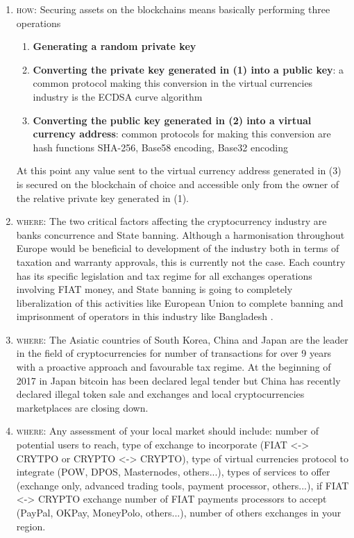 \documentclass[11pt,fleqn,oneside]{book} %
\begin{document}
\begin{enumerate}
	\item \textsc{how}: Securing assets on the blockchains means basically performing three operations
		\begin{enumerate}[label*=\arabic*.]
			\item \textbf{Generating a random private key}
			\item \textbf{Converting the private key generated in (1) into a public key}: a common protocol making this conversion
			in the virtual currencies industry is the ECDSA curve algorithm
			\item \textbf{Converting the public key generated in (2) into a virtual currency address}: common protocols for making this conversion
			are hash functions SHA-256, Base58 encoding, Base32 encoding
		\end{enumerate}
	At this point any value sent to the virtual currency address generated in (3) is secured on the blockchain of choice and accessible
	only from the owner of the relative private key generated in (1).
	\item \textsc{where}: The two critical factors affecting the cryptocurrency industry are banks concurrence and State banning.
	Although a harmonisation throughout Europe would be beneficial to development of the industry both in terms of 
	taxation and warranty approvals, this is currently not the case. Each country has its specific legislation and tax
	regime for all exchanges operations involving FIAT money, and State banning is going to completely liberalization 
	of this activities like European Union to complete banning and imprisonment of operators in this industry like Bangladesh
	\cite{bitcoinLegality}. 

	\item \textsc{where}: The Asiatic countries of South Korea, China and Japan are the leader in the field of cryptocurrencies for number of 
	transactions for over 9 years with a proactive approach and favourable tax regime. At the beginning of 2017 in Japan bitcoin
	has been declared legal tender but China has recently declared illegal token sale and exchanges and local cryptocurrencies
	marketplaces are closing down.
	\item \textsc{where}: Any assessment of your local market should include: number of potential users to reach, 
	type of exchange to incorporate (FIAT <-> CRYTPO or CRYPTO <-> CRYPTO), type of virtual currencies protocol 
	to integrate (POW, DPOS, Masternodes, others...), types of services to offer (exchange only, advanced trading tools,
	payment processor, others...), if FIAT <-> CRYPTO exchange number of FIAT payments processors to accept (PayPal, OKPay,
	MoneyPolo, others...), number of others exchanges in your region.


\end{enumerate}
\end{document}
